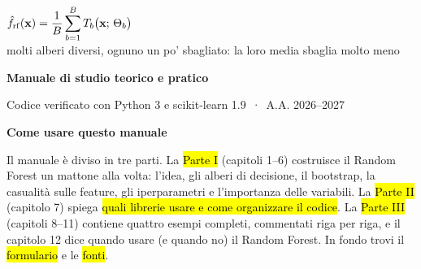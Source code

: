 \begin{center}
\begin{tcolorbox}[enhanced,width=.8\linewidth,colback=white,colframe=navy!35,arc=6pt,boxrule=.8pt,halign=flush center,top=8pt,bottom=8pt]
\Large $\displaystyle \hat f_{\mathrm{rf}}(\mathbf{x})=\frac{1}{B}\sum_{b=1}^{B} T_b\big(\mathbf{x};\,\Theta_b\big)$\\[4pt]
{\headfont\small\color{grigio} molti alberi diversi, ognuno un po' sbagliato: la loro media sbaglia molto meno}
\end{tcolorbox}
\vspace{.8cm}
{\headfont\large\color{navy}\bfseries Manuale di studio teorico e pratico\par}
\vspace{2pt}
{\headfont\color{grigio}Codice verificato con Python 3 e scikit-learn 1.9 \,·\, A.A. 2026--2027\par}
\vspace{.9cm}
\end{center}
\clearpage\thispagestyle{plain}
{\headfont\bfseries\Huge\color{navy}Come usare questo manuale\par}
\vspace{4pt}{\color{teal}\rule{3cm}{2.5pt}}\vspace{8pt}

Il manuale è diviso in tre parti. La \hl{Parte I} (capitoli 1--6) costruisce il Random Forest un mattone alla volta: l'idea, gli alberi di decisione, il bootstrap, la casualità sulle feature, gli iperparametri e l'importanza delle variabili. La \hl{Parte II} (capitolo 7) spiega \hl{quali librerie usare e come organizzare il codice}. La \hl{Parte III} (capitoli 8--11) contiene quattro esempi completi, commentati riga per riga, e il capitolo 12 dice quando usare (e quando no) il Random Forest. In fondo trovi il \hl{formulario} e le \hl{fonti}.

